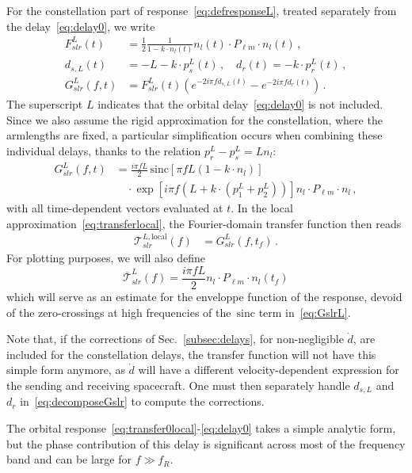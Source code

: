 \documentclass[aps,showpacs,twocolumn,
prd,superscriptaddress,nofootinbib]{revtex4-1}
\newcommand{\be}{\begin{equation}}
\newcommand{\ee}{\end{equation}}
\newcommand\calT{{\mathcal{T}}}
\newcommand{\nn}{\nonumber}
\newcommand{\hatk}{k}
\newcommand{\sinc}{\,\mathrm{sinc}}
\newcommand{\tf}{t_{f}}
\begin{document}
For the constellation part of response~\eqref{eq:defresponseL}, treated separately from the delay~\eqref{eq:delay0}, we write
\begin{align}\label{eq:decomposeGslr}
	F_{slr}^{L}(t) &= \frac{1}{2} \frac{1}{1 - \hatk\cdot n_{l}(t)} n_{l}(t) \cdot P_{\ell m} \cdot n_{l} (t) \,,\nn\\
	d_{s,L}(t) &= -L - k\cdot p_{s}^{L}(t) \,, \quad d_{r}(t) = - k\cdot p_{r}^{L}(t) \,,\nn\\
	G_{slr}^{L}(f,t) &=  F_{slr}^{L}(t) \left( e^{-2i\pi f d_{s,L}(t)} - e^{-2i\pi f d_{r}(t)} \right) \,.
\end{align}
The superscript $L$ indicates that the orbital delay~\eqref{eq:delay0} is not included. Since we also assume the rigid approximation for the constellation, where the armlengths are fixed, a particular simplification occurs when combining these individual delays, thanks to the relation $p^{L}_{r} - p^{L}_{s} =  L n_{l}$:
\begin{align}\label{eq:GslrL}
	G_{slr}^{L}(f,t) &= \frac{i \pi f L}{2} \sinc \left[ \pi f L\left(1-\hatk\cdot n_{l} \right) \right] \nn\\
	& \quad \cdot \exp\left[ i \pi f \left( L + \hatk\cdot \left( p_{1}^{L} + p_{2}^{L} \right) \right) \right]  n_{l} \cdot P_{\ell m} \cdot n_{l} \,,
\end{align}
with all time-dependent vectors evaluated at $t$. In the local approximation~\eqref{eq:transferlocal}, the Fourier-domain transfer function then reads
\begin{align}\label{eq:transferLlocal}
	\calT_{slr}^{L, \mathrm{local}}(f) &= G_{slr}^{L}(f, \tf) \,.
\end{align}
For plotting purposes, we will also define
\be\label{eq:transferLenvelope}
	\overline{\calT}_{slr}^{L} (f) = \frac{i \pi f L}{2} n_{l} \cdot P_{\ell m} \cdot n_{l} (\tf)
\ee
which will serve as an estimate for the enveloppe function of the response, devoid of the zero-crossings at high frequencies of the $\sinc$ term in~\eqref{eq:GslrL}. 

Note that, if the corrections of Sec.~\ref{subsec:delays}, for non-negligible $\dot d$, are included for the constellation delays, the transfer function will not have this simple form anymore, as $\dot{d}$ will have a different velocity-dependent expression for the sending and receiving spacecraft. One must then separately handle $d_{s,L}$ and $d_{r}$ in~\eqref{eq:decomposeGslr} to compute the corrections.

The orbital response~\eqref{eq:transfer0local}-\eqref{eq:delay0} takes a simple analytic form, but the phase contribution of this delay is significant across most of the frequency band and can be large for $f \gg f_{R}$.
\end{document}
